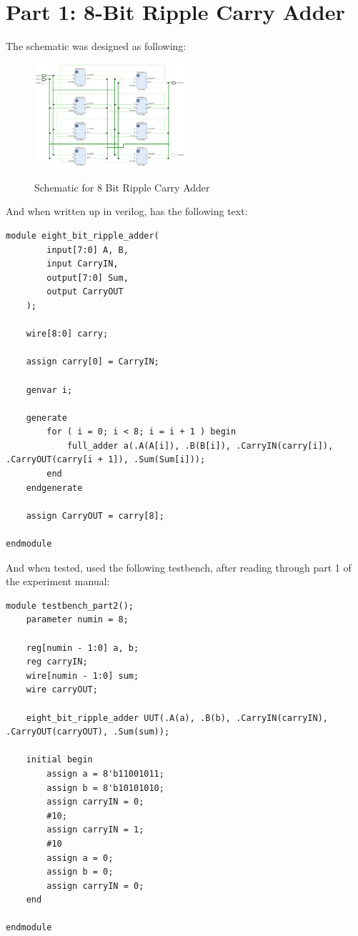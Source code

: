 \section{Part 1: 8-Bit Ripple Carry Adder}
The schematic was designed as following:
\begin{figure}[!htbp]
    \centering
    \caption{Schematic for 8 Bit Ripple Carry Adder}
    \includegraphics[width=0.5\textwidth]{part-2-schem.png}
    \label{8 Bit Ripple Carry Schematic}
\end{figure}
And when written up in verilog, has the following text:
\begin{lstlisting}[caption={test}, label={label}, style=Verilog]
module eight_bit_ripple_adder(
        input[7:0] A, B, 
        input CarryIN,
        output[7:0] Sum, 
        output CarryOUT
    );
    
    wire[8:0] carry;
    
    assign carry[0] = CarryIN;
    
    genvar i;
    
    generate
        for ( i = 0; i < 8; i = i + 1 ) begin
            full_adder a(.A(A[i]), .B(B[i]), .CarryIN(carry[i]), .CarryOUT(carry[i + 1]), .Sum(Sum[i]));
        end
    endgenerate
    
    assign CarryOUT = carry[8];
    
endmodule
\end{lstlisting}
And when tested, used the following testbench, after reading through part 1 of the experiment manual:
\begin{lstlisting}[caption={test}, label={label}, style=Verilog]
module testbench_part2();
    parameter numin = 8;
    
    reg[numin - 1:0] a, b;
    reg carryIN;
    wire[numin - 1:0] sum;
    wire carryOUT;
    
    eight_bit_ripple_adder UUT(.A(a), .B(b), .CarryIN(carryIN), .CarryOUT(carryOUT), .Sum(sum));
    
    initial begin
        assign a = 8'b11001011;
        assign b = 8'b10101010;
        assign carryIN = 0;
        #10;
        assign carryIN = 1;
        #10
        assign a = 0;
        assign b = 0;
        assign carryIN = 0;
    end
    
endmodule
\end{lstlisting}
